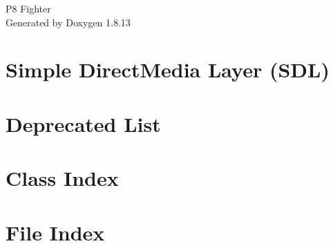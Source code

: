 \documentclass[twoside]{book}
\newcommand{\+}{\discretionary{\mbox{\scriptsize$\hookleftarrow$}}{}{}}
\newcommand{\clearemptydoublepage}{%
  \newpage{\pagestyle{empty}\cleardoublepage}%
}
\begin{document}
\hypersetup{pageanchor=false,
             bookmarksnumbered=true,
             pdfencoding=unicode
            }
\begin{titlepage}
\vspace*{7cm}
\begin{center}%
{\Large P8 Fighter }\\
\vspace*{1cm}
{\large Generated by Doxygen 1.8.13}\\
\end{center}
\end{titlepage}
\clearemptydoublepage
{}
\tableofcontents
\clearemptydoublepage
{}
\hypersetup{pageanchor=true}

\chapter{Simple Direct\+Media Layer (S\+DL)}
\label{index}\hypertarget{index}{}
\chapter{Deprecated List}
\label{deprecated}

\chapter{Class Index}

\chapter{File Index}

\end{document}
